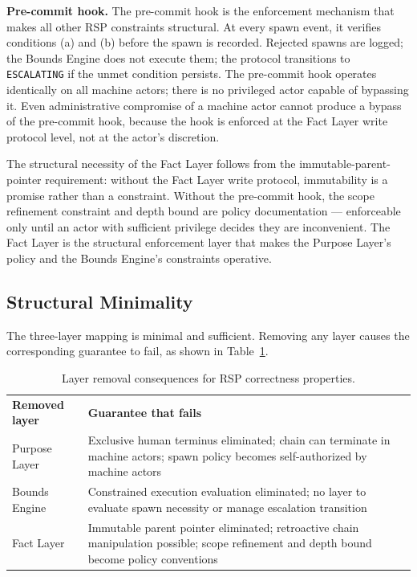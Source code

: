 \medskip
\noindent\textbf{Pre-commit hook.} The pre-commit hook is the enforcement mechanism that makes all other RSP constraints structural. At every spawn event, it verifies conditions (a) and (b) before the spawn is recorded. Rejected spawns are logged; the Bounds Engine does not execute them; the protocol transitions to \texttt{ESCALATING} if the unmet condition persists. The pre-commit hook operates identically on all machine actors; there is no privileged actor capable of bypassing it. Even administrative compromise of a machine actor cannot produce a bypass of the pre-commit hook, because the hook is enforced at the Fact Layer write protocol level, not at the actor's discretion.

The structural necessity of the Fact Layer follows from the immutable-parent-pointer requirement: without the Fact Layer write protocol, immutability is a promise rather than a constraint. Without the pre-commit hook, the scope refinement constraint and depth bound are policy documentation — enforceable only until an actor with sufficient privilege decides they are inconvenient. The Fact Layer is the structural enforcement layer that makes the Purpose Layer's policy and the Bounds Engine's constraints operative.

\subsection{Structural Minimality}
\label{sec:rs-minimality}

The three-layer mapping is minimal and sufficient. Removing any layer causes the corresponding guarantee to fail, as shown in Table~\ref{tab:rs-layer-minimality}.

\begin{table}[h]
\begin{center}
\begin{tabular}{p{3.4cm} p{4.6cm}}
\toprule
\textbf{Removed layer} & \textbf{Guarantee that fails} \\\n\midrule
Purpose Layer & Exclusive human terminus eliminated; chain can terminate in machine actors; spawn policy becomes self-authorized by machine actors \\
Bounds Engine & Constrained execution evaluation eliminated; no layer to evaluate spawn necessity or manage escalation transition \\
Fact Layer & Immutable parent pointer eliminated; retroactive chain manipulation possible; scope refinement and depth bound become policy conventions \\
\bottomrule
\end{tabular}
\caption{Layer removal consequences for RSP correctness properties.}
\label{tab:rs-layer-minimality}
\end{center}
\end{table}

